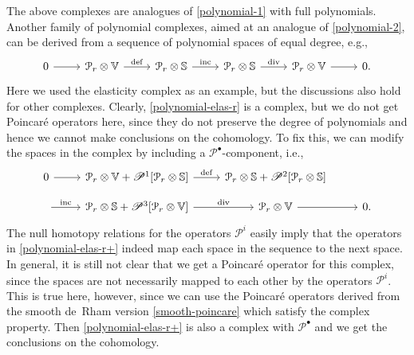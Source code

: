 \documentclass[11pt]{amsart}
\newcommand{\0}{\mathaccent23}
\newcommand\inc{\operatorname{inc}}
\newcommand\deff{\operatorname{def}}
\renewcommand\div{\operatorname{div}}
\newcommand{\bs}{{\scriptscriptstyle \bullet}}
\begin{document}
The above complexes are analogues of \eqref{polynomial-1} with full polynomials. Another family of polynomial complexes, aimed at an analogue of \eqref{polynomial-2}, can be derived from a sequence of polynomial spaces of equal degree, e.g., 
   \begin{equation}\label{polynomial-elas-r} 
\begin{tikzcd}
  0 \arrow{r}& \mathcal{P}_{r}\otimes \mathbb{V}\arrow{r}{\deff}& \mathcal{P}_{r}\otimes \mathbb{S}\arrow{r}{\inc }& \mathcal{P}_{r}\otimes \mathbb{S} \arrow{r}{\div }&\mathcal{P}_{r}\otimes \mathbb{V} \arrow{r}&0.
\end{tikzcd}
\end{equation}
Here we used the elasticity complex as an example, but the discussions also hold for other complexes.  Clearly, \eqref{polynomial-elas-r} is a complex, but we do not get Poincar\'e operators here, since they do not preserve the degree of polynomials and hence we cannot make conclusions on the cohomology. To fix this, we can modify the spaces in the complex by including a $\mathscr{P}^\bs$-component, i.e., 
\begin{equation}\label{polynomial-elas-r+} 
\begin{tikzcd}[row sep=small]
   0 \arrow{r}& \mathcal{P}_{r}\otimes \mathbb{V} + \mathscr{P}^{1}[\mathcal{P}_{r}\otimes \mathbb{S}]\arrow{r}{\deff}& \mathcal{P}_{r}\otimes \mathbb{S} + \mathscr{P}^{2}[\mathcal{P}_{r}\otimes \mathbb{S}]\\
   \arrow{r}{\inc }& \mathcal{P}_{r}\otimes \mathbb{S} + \mathscr{P}^{3}[\mathcal{P}_{r}\otimes \mathbb{V}] \arrow{r}{\div }&\mathcal{P}_{r}\otimes \mathbb{V} \arrow{r}&0.
\end{tikzcd}
\end{equation}
 The null homotopy relations for the operators $\mathscr{P}^{i}$ easily imply that the operators in \eqref{polynomial-elas-r+} indeed map each space in the sequence to the next space. In general, it is still not clear that we get a Poincar\'e operator for this complex, since the spaces are not necessarily mapped to each other by the operators $\mathscr{P}^i$. This is true here, however, since we can use the Poincar\'e operators derived from the smooth de~Rham version \eqref{smooth-poincare} which satisfy
 the complex property. Then \eqref{polynomial-elas-r+} is also a complex with $\mathscr{P}^{\bs}$ and we get the conclusions on the cohomology.
\end{document}
